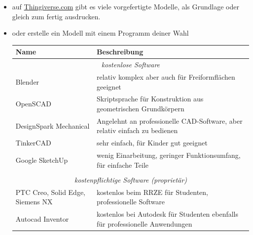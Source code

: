 \documentclass{\basedir/fablab-document}
\begin{document}
	\begin{itemize}
		\item auf \href{https://thingiverse.com}{Thingiverse.com} gibt es viele vorgefertigte Modelle, als
		Grundlage oder gleich zum fertig ausdrucken.
		\item oder erstelle ein Modell mit einem Programm deiner Wahl
		\begin{table}[H]
			\centering
			\begin{tabularx}{\textwidth}{|l|X|}
				\hline \textbf{Name} & \textbf{Beschreibung} \\
				\hline \multicolumn{2}{|c|}{\textit{kostenlose Software}}  \\
				\hline Blender & relativ komplex aber auch für Freiformflächen geeignet  \\
				\hline OpenSCAD & Skriptsprache für Konstruktion aus geometrischen Grundkörpern \\
				\hline DesignSpark Mechanical & Angelehnt an professionelle CAD-Software, aber relativ einfach zu bedienen  \\
				\hline TinkerCAD & sehr einfach, für Kinder gut geeignet  \\
				\hline Google SketchUp & wenig Einarbeitung, geringer Funktionsumfang, für einfache Teile \\
				\hline & \\
				\hline \multicolumn{2}{|c|}{\textit{kostenpflichtige Software (proprietär)}}  \\
				\hline PTC Creo, Solid Edge, Siemens NX & kostenlos beim RRZE für Studenten, professionelle Software \\
				\hline Autocad Inventor & kostenlos bei Autodesk für Studenten ebenfalls für professionelle Anwendungen \\
				\hline
			\end{tabularx}
		\end{table}
	\end{itemize}
	
\end{document}
